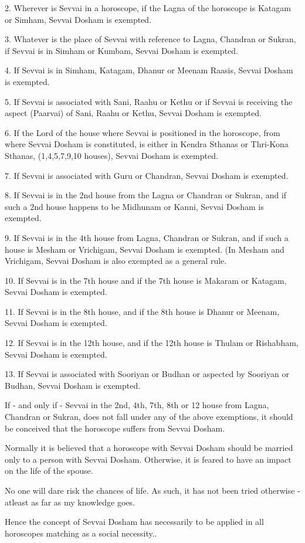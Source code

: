 \documentclass[12pt, right open]{memoir}
\begin{document}
2.  Wherever is Sevvai in a horoscope, if the Lagna of the horoscope is Katagam or Simham, Sevvai Dosham is exempted.

3.  Whatever is the place of Sevvai with reference to Lagna, Chandran or Sukran, if Sevvai is in Simham or Kumbam, Sevvai Dosham is exempted.

4.  If Sevvai is in Simham, Katagam, Dhanur or Meenam Raasis, Sevvai Dosham is exempted.

5.  If Sevvai is associated with Sani, Raahu or Kethu or if Sevvai is receiving the aspect (Paarvai) of Sani, Raahu or Kethu, Sevvai Dosham is exempted.

6.  If the Lord of the house where Sevvai is positioned in the horoscope, from where Sevvai Dosham is constituted, is either in Kendra Sthanas or Thri-Kona Sthanas, (1,4,5,7,9,10 houses), Sevvai Dosham is exempted.

7.  If Sevvai is associated with Guru or Chandran, Sevvai Dosham is exempted.

8.  If Sevvai is in the 2nd house from the Lagna or Chandran or Sukran, and if such a 2nd house happens to be Midhunam or Kanni, Sevvai Dosham is exempted.

9.  If Sevvai is in the 4th house from Lagna, Chandran or Sukran, and if such a house is Mesham or Vrichigam, Sevvai Dosham is exempted.  (In Mesham and Vrichigam, Sevvai Dosham is also exempted as a general rule.

10.  If Sevvai is in the 7th house and if the 7th house is Makaram or Katagam, Sevvai Dosham is exempted.

11.  If Sevvai is in the 8th house, and if the 8th house is Dhanur or Meenam, Sevvai Dosham is exempted.

12.  If Sevvai is in the 12th house, and if the 12th house is Thulam or Rishabham, Sevvai Dosham is exempted.

13.  If Sevvai is associated with Sooriyan or Budhan or aspected by Sooriyan or Budhan, Sevvai Dosham is exempted.

If - and only if - Sevvai in the 2nd, 4th, 7th, 8th or 12 house from Lagna, Chandran or Sukran, does not fall under any of the above exemptions, it should be conceived that the horoscope suffers from Sevvai Dosham.

Normally it is believed that a horoscope with Sevvai Dosham should be married only to a person with Sevvai Dosham.  Otherwise, it is feared to have an impact on the life of the spouse.

No one will dare risk the chances of life.  As such, it has not been tried otherwise - atleast as far as my knowledge goes.

Hence the concept of Sevvai Dosham has necessarily to be applied in all horoscopes matching as a social necessity..
\end{document}
